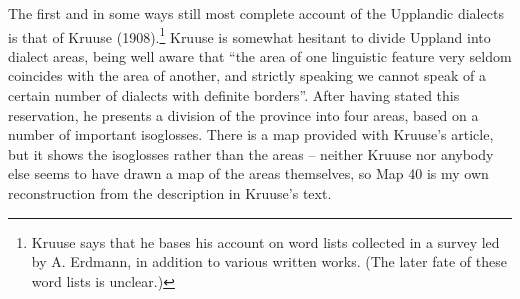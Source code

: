  The first and in some ways still most complete account of the Upplandic dialects is that of Kruuse (1908).\footnote{ Kruuse says that he bases his account on word lists collected in a survey led by A. Erdmann, in addition to various written works. (The later fate of these word lists is unclear.) } Kruuse is somewhat hesitant to divide Uppland into dialect areas, being well aware that “the area of one linguistic feature very seldom coincides with the area of another, and strictly speaking we cannot speak of a certain number of dialects with definite borders”. After having stated this reservation, he presents a division of the province into four areas, based on a number of important isoglosses. There is a map provided with Kruuse’s article, but it shows the isoglosses rather than the areas – neither Kruuse nor anybody else seems to have drawn a map of the areas themselves, so Map 40 is my own reconstruction from the description in Kruuse’s text. 


